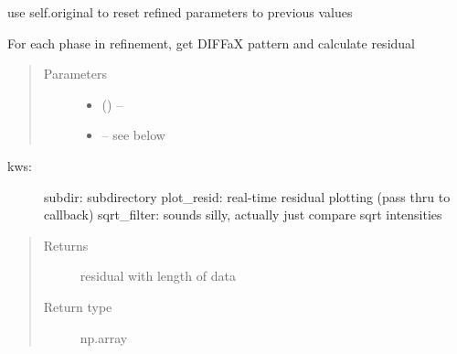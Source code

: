 \documentclass[letterpaper,10pt,english]{sphinxmanual}
\begin{document}
\begin{fulllineitems}
\begin{fulllineitems}
\end{fulllineitems}


\begin{fulllineitems}
\label{\detokenize{rst/refinement:mstack.refinement.Refinement.reset}}
use self.original to reset refined parameters to previous values

\end{fulllineitems}


\begin{fulllineitems}
\label{\detokenize{rst/refinement:mstack.refinement.Refinement.residual_method}}
For each phase in refinement, get DIFFaX pattern and calculate residual
\begin{quote}\begin{description}
\item[{Parameters}] \leavevmode\begin{itemize}
\item {} 
 () -- 

\item {} 
 -- see below

\end{itemize}

\end{description}\end{quote}
\begin{description}
\item[{kws:}] \leavevmode
subdir: subdirectory
plot\_resid: real-time residual plotting (pass thru to callback)
sqrt\_filter: sounds silly, actually just compare sqrt intensities

\end{description}
\begin{quote}\begin{description}
\item[{Returns}] \leavevmode
residual with length of data

\item[{Return type}] \leavevmode
np.array

\end{description}\end{quote}


\end{fulllineitems}
\end{fulllineitems}
\end{document}
